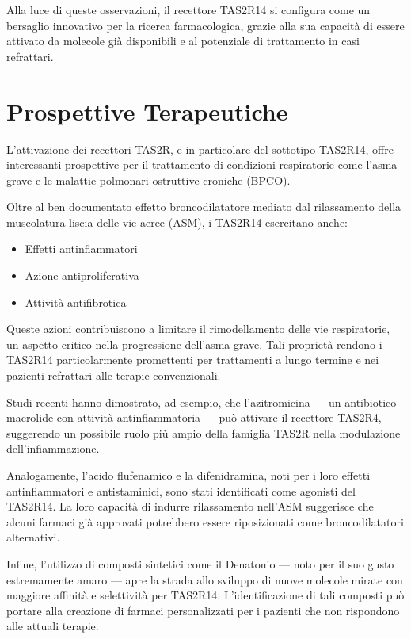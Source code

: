 \documentclass[12pt, a4paper]{book}
\begin{document}
Alla luce di queste osservazioni, il recettore TAS2R14 si configura come un bersaglio innovativo per la ricerca farmacologica, grazie alla sua capacità di essere attivato da molecole già disponibili e al potenziale di trattamento in casi refrattari.
\newpage
\chapter{Prospettive Terapeutiche}

L’attivazione dei recettori TAS2R, e in particolare del sottotipo TAS2R14, offre interessanti prospettive per il trattamento di condizioni respiratorie come l’asma grave e le malattie polmonari ostruttive croniche (BPCO).

Oltre al ben documentato effetto broncodilatatore mediato dal rilassamento della muscolatura liscia delle vie aeree (ASM), i TAS2R14 esercitano anche:
\begin{itemize}
    \item Effetti antinfiammatori
    \item Azione antiproliferativa
    \item Attività antifibrotica
\end{itemize}

Queste azioni contribuiscono a limitare il rimodellamento delle vie respiratorie, un aspetto critico nella progressione dell’asma grave. Tali proprietà rendono i TAS2R14 particolarmente promettenti per trattamenti a lungo termine e nei pazienti refrattari alle terapie convenzionali.

Studi recenti hanno dimostrato, ad esempio, che l’azitromicina — un antibiotico macrolide con attività antinfiammatoria — può attivare il recettore TAS2R4, suggerendo un possibile ruolo più ampio della famiglia TAS2R nella modulazione dell’infiammazione.

Analogamente, l’acido flufenamico e la difenidramina, noti per i loro effetti antinfiammatori e antistaminici, sono stati identificati come agonisti del TAS2R14. La loro capacità di indurre rilassamento nell’ASM suggerisce che alcuni farmaci già approvati potrebbero essere riposizionati come broncodilatatori alternativi.

Infine, l’utilizzo di composti sintetici come il Denatonio — noto per il suo gusto estremamente amaro — apre la strada allo sviluppo di nuove molecole mirate con maggiore affinità e selettività per TAS2R14. L’identificazione di tali composti può portare alla creazione di farmaci personalizzati per i pazienti che non rispondono alle attuali terapie.
\newpage
\end{document}
